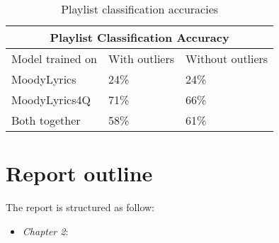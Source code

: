 \begin{table}[H]
\centering
\begin{tabular}{ |p{3cm}||p{1.5cm}|p{1.5cm}| }
 \hline
 \multicolumn{3}{|c|}{Playlist Classification Accuracy} \\
 \hline
Model trained on & With outliers & Without outliers\\
 \hline
MoodyLyrics & 24\% & 24\%\\
MoodyLyrics4Q  & 71\%    &66\%\\
Both together &   58\%  & 61\%\\
\hline
\end{tabular}
\caption{Playlist classification accuracies} \label{tab:compar2}
\end{table}

\section{Report outline}
The report is structured as follow: 
\begin{itemize}
\item \textit{Chapter 2}: 
\end{itemize}











